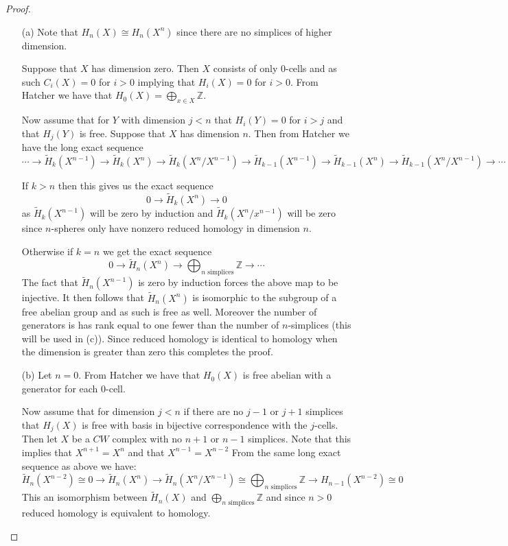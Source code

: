 \documentclass[10pt]{article}
\newcommand{\bb}[1]{\mathbb{#1}}
\newcommand{\wt}[1]{\widetilde{#1}}
\theoremstyle{plain}
\theoremstyle{remark}
\begin{document}
\begin{proof}
  \begin{enumerate}
  \item[(a)]
    Note that $H_n(X)\cong H_n(X^n)$ since there are no simplices of higher dimension.
    
    Suppose that $X$ has dimension zero. Then $X$ consists of only $0$-cells
    and as such $C_i(X)=0$ for $i>0$ implying that $H_i(X)=0$ for $i>0$. From
    Hatcher we have that $H_0(X)=\bigoplus_{x\in X}\bb{Z}$.

    Now assume that for $Y$ with dimension $j<n$ that $H_i(Y)=0$ for $i>j$ and
    that $H_j(Y)$ is free. Suppose that $X$ has dimension $n$. Then from Hatcher
    we have the long exact sequence
    \[
      \cdots \rightarrow \wt{H}_k(X^{n-1})\rightarrow \wt{H}_k(X^n) \rightarrow \wt{H}_k(X^n/X^{n-1}) \rightarrow \wt{H}_{k-1}(X^{n-1}) \rightarrow \wt{H}_{k-1}(X^n) \rightarrow \wt{H}_{k-1}(X^n/X^{n-1}) \rightarrow \cdots
    \]

    If $k>n$ then this gives us the exact sequence
    \[
      0\rightarrow \wt{H}_k(X^n)\rightarrow 0
    \]
    as $\wt{H}_k(X^{n-1})$ will be zero by induction and $\wt{H}_k(X^n/x^{n-1})$ will
    be zero since $n$-spheres only have nonzero reduced homology in dimension $n$.

    Otherwise if $k=n$ we get the exact sequence
    \[
      0\rightarrow \wt{H}_n(X^n)\rightarrow \bigoplus_{n\text{ simplices}}\bb{Z}\rightarrow\cdots
    \]
    The fact that $\wt{H}_n(X^{n-1})$ is zero by induction forces the above map
    to be injective. It then follows that $\wt{H}_n(X^n)$ is isomorphic to the
    subgroup of a free abelian group and as such is free as well. Moreover the
    number of generators is has rank equal to one fewer than the number of $n$-simplices
    (this will be used in (c)). Since reduced homology is identical to homology
    when the dimension is greater than zero this completes the proof. 
    
  \item[(b)]
    Let $n=0$. From Hatcher we have that $H_0(X)$ is free abelian
    with a generator for each 0-cell.

    Now assume that for dimension $j<n$ if there are no $j-1$ or $j+1$ simplices
    that $H_j(X)$ is free with basis in bijective correspondence with the $j$-cells.
    Then let $X$ be a $CW$ complex with no $n+1$ or $n-1$ simplices. Note that this
    implies that $X^{n+1}=X^n$ and  that $X^{n-1}=X^{n-2}$ From the
    same long exact sequence as above we have:
    \[
      \wt{H}_n(X^{n-2})\cong 0\rightarrow \wt{H}_n(X^n)\rightarrow\wt{H}_n(X^n/X^{n-1})\cong\bigoplus_{n\text{ simplices}}\bb{Z} \rightarrow H_{n-1}(X^{n-2})\cong 0
    \]
    This an isomorphism between $\wt{H}_n(X)$ and $\bigoplus_{n\text{ simplices}}\bb{Z}$ and since
    $n>0$ reduced homology is equivalent to homology.


\end{enumerate}
\end{proof}
\end{document}
